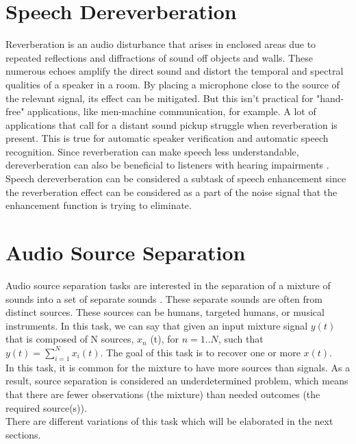 

\section{Speech Dereverberation}
Reverberation is an audio disturbance that arises in enclosed areas due to repeated reflections and diffractions of sound off objects and walls. These numerous echoes amplify the direct sound and distort the temporal and spectral qualities of a speaker in a room. By placing a microphone close to the source of the relevant signal, its effect can be mitigated. But this isn't practical for "hand-free" applications, like men-machine communication, for example. A lot of applications that call for a distant sound pickup struggle when reverberation is present. This is true for automatic speaker verification and automatic speech recognition. Since reverberation can make speech less understandable, dereverberation can also be beneficial to listeners with hearing impairments \cite{lebart2001}.
Speech dereverberation can be considered a subtask of speech enhancement since the reverberation effect can be considered as a part of the noise signal that the enhancement function is trying to eliminate.

\section{Audio Source Separation}
Audio source separation tasks are interested in the separation of a mixture of sounds into a set of separate sounds \cite{vincent2018}. These separate sounds are often from distinct sources. These sources can be humans, targeted humans, or musical instruments.
In this task, we can say that given an input mixture signal $y(t)$ that is composed of N sources, $x_n$ (t), for $n=1..N$, such that $y(t) = \sum_{i=1}^{N} x_i(t)$. The goal of this task is to recover one or more $x(t)$.\\
In this task, it is common for the mixture to have more sources than signals. As a result, source separation is considered an underdetermined problem, which means that there are fewer observations (the mixture) than needed outcomes (the required source(s)).\\
There are different variations of this task which will be elaborated in the next sections.

